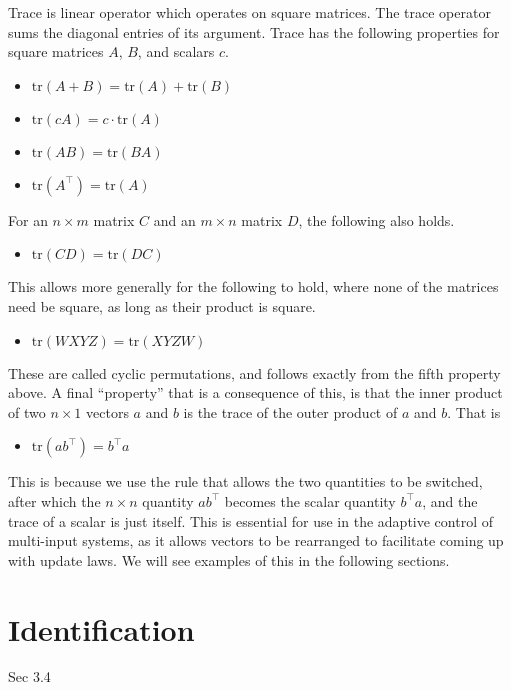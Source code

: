 Trace is linear operator which operates on square matrices.
The trace operator sums the diagonal entries of its argument.
Trace has the following properties for square matrices $A$, $B$, and scalars $c$.
\begin{itemize}
  \setlength{\itemsep}{0pt}
  \item{$\text{tr}(A+B)=\text{tr}(A)+\text{tr}(B)$}
  \item{$\text{tr}(cA)=c\cdot\text{tr}(A)$}
  \item{$\text{tr}(AB)=\text{tr}(BA)$}
  \item{$\text{tr}(A^{\top})=\text{tr}(A)$}
\end{itemize}
For an $n\times m$ matrix $C$ and an $m\times n$ matrix $D$, the following also holds.
\begin{itemize}
  \item{$\text{tr}(CD)=\text{tr}(DC)$}
\end{itemize}
This allows more generally for the following to hold, where none of the matrices need be square, as long as their product is square.
\begin{itemize}
  \item{$\text{tr}(WXYZ)=\text{tr}(XYZW)$}
\end{itemize}
These are called cyclic permutations, and follows exactly from the fifth property above.
A final ``property'' that is a consequence of this, is that the inner product of two $n\times1$ vectors $a$ and $b$ is the trace of the outer product of $a$ and $b$.
That is
\begin{itemize}
  \item{$\text{tr}(ab^{\top})=b^{\top}a$}
\end{itemize}
This is because we use the rule that allows the two quantities to be switched, after which the $n\times n$ quantity $ab^{\top}$ becomes the scalar quantity $b^{\top}a$, and the trace of a scalar is just itself.
This is essential for use in the adaptive control of multi-input systems, as it allows vectors to be rearranged to facilitate coming up with update laws.
We will see examples of this in the following sections.

\section{Identification}

Sec 3.4

